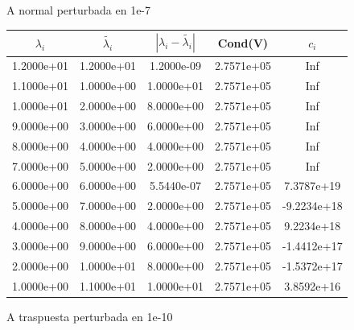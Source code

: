 \documentclass{article}
\begin{document}
\begin{itemize}
\begin{enumerate}[(a)]
\begin{figure}[h!]
\begin{tabular}{c|c|c|c|c}
\end{tabular}
\caption{A normal perturbada en 1e-7}
\end{figure}
\begin{figure}[h!]
\centering
\begin{tabular}{c|c|c|c|c}
$\lambda_{i}$&$\tilde{\lambda_{i}}$ &$|\lambda_{i}-\tilde{\lambda_{i}}|$ &Cond(V) &$c_i$\\
\hline
1.2000e+01&1.2000e+01&1.2000e-09&2.7571e+05&Inf\\
\hline
1.1000e+01&1.0000e+00&1.0000e+01&2.7571e+05&Inf\\
\hline
1.0000e+01&2.0000e+00&8.0000e+00&2.7571e+05&Inf\\
\hline
9.0000e+00&3.0000e+00&6.0000e+00&2.7571e+05&Inf\\
\hline
8.0000e+00&4.0000e+00&4.0000e+00&2.7571e+05&Inf\\
\hline
7.0000e+00&5.0000e+00&2.0000e+00&2.7571e+05&Inf\\
\hline
6.0000e+00&6.0000e+00&5.5440e-07&2.7571e+05&7.3787e+19\\
\hline
5.0000e+00&7.0000e+00&2.0000e+00&2.7571e+05&-9.2234e+18\\
\hline
4.0000e+00&8.0000e+00&4.0000e+00&2.7571e+05&9.2234e+18\\
\hline
3.0000e+00&9.0000e+00&6.0000e+00&2.7571e+05&-1.4412e+17\\
\hline
2.0000e+00&1.0000e+01&8.0000e+00&2.7571e+05&-1.5372e+17\\
\hline
1.0000e+00&1.1000e+01&1.0000e+01&2.7571e+05&3.8592e+16\\
\hline
\end{tabular}
\caption{A traspuesta perturbada en 1e-10}
\end{figure}
\end{enumerate}
\end{itemize}
\end{document}
